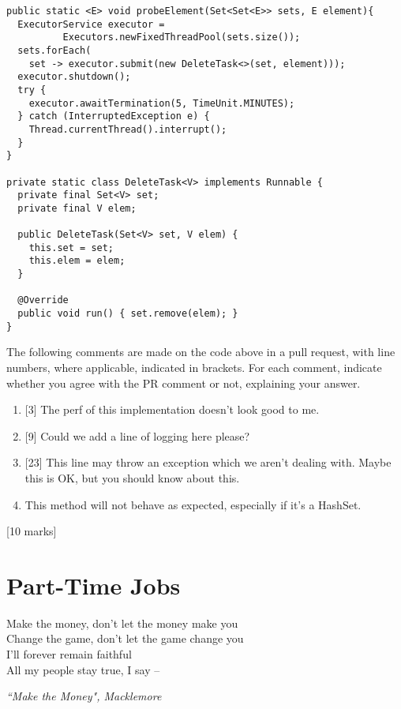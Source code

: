 \documentclass[12pt, a4paper]{article}
\begin{document}
\begin{enumerate}
\begin{enumerate}
\lstset{
  language = Java,
  basicstyle = \ttfamily \footnotesize,
  numbers = left,
  numberstyle = \scriptsize,
  showstringspaces = false
}
\begin{lstlisting}
public static <E> void probeElement(Set<Set<E>> sets, E element){
  ExecutorService executor = 
          Executors.newFixedThreadPool(sets.size());
  sets.forEach(
    set -> executor.submit(new DeleteTask<>(set, element)));
  executor.shutdown();
  try {
    executor.awaitTermination(5, TimeUnit.MINUTES);
  } catch (InterruptedException e) {
    Thread.currentThread().interrupt();
  }
}

private static class DeleteTask<V> implements Runnable {
  private final Set<V> set;
  private final V elem;
  
  public DeleteTask(Set<V> set, V elem) {
    this.set = set;
    this.elem = elem;
  }

  @Override
  public void run() { set.remove(elem); }
}
\end{lstlisting}
\lstset{
  language = C,
  basicstyle = \ttfamily \small,
  numbers = left,
  numberstyle = \footnotesize,
  showstringspaces = false
}

The following comments are made on the code above in a pull request, with line numbers, where applicable, indicated in brackets. For each comment, indicate whether you agree with the PR comment or not, explaining your answer.
\begin{enumerate}
\item \hspace{0pt} [3] The perf of this implementation doesn't look good to me.
\item \hspace{0pt} [9] Could we add a line of logging here please?
\item \hspace{0pt} [23] This line may throw an exception which we aren't dealing with. Maybe this is OK, but you should know about this.
\item \hspace{0pt} This method will not behave as expected, especially if it's a HashSet.
\end{enumerate}
\end{enumerate}
[10 marks]

\end{enumerate}

\section{Part-Time Jobs}
\epigraph{Make the money, don't let the money make you \\
Change the game, don't let the game change you \\
I'll forever remain faithful \\
All my people stay true, I say --
}{\textit{``Make the Money", Macklemore}}
\end{document}
